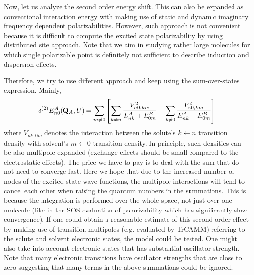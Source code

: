 \documentclass[a4paper,titlepage,twoside,fleqn,12pt]{book}
\begin{document}
Now, let us analyze the second order energy shift. This can also
be expanded as conventional interaction energy with making use
of static and dynamic imaginary frequency dependent polarizabilities.
However, such approach is not convenient because it is difficult
to compute the excited state polarizability by using distributed
site approach. Note that we aim in studying rather large molecules
for which single polarizable point is definitely not sufficient to
describe induction and dispersion effects.

Therefore, we try to use different approach and keep using the 
sum\hyp{}over\hyp{}states expression. Mainly,
%
\begin{equation}
\delta^{(2)} E^A_{n0}({\bf Q}_A, U) = 
\sum_{m\ne 0} 
\left[
\sum_{k\ne n}  \frac{ V_{n0,km}^2 }{E^A_{nk} + E^B_{0m}}
%
- \sum_{k\ne 0} \frac{
V_{n0,km}^2
}{E^A_{nk} + E^B_{0m}}
\right]
\end{equation}
%
where $V_{nk,0m}$ denotes the interaction between the 
solute's $k\leftarrow n$ transition density with
solvent's $m\leftarrow 0$ transition density. In principle,
such densities can be also multipole expanded (exchange effects should
be small compared to the electrostatic effects).
The price we have to pay is to deal with the sum that do not need to
converge fast. Here we hope that due to the increased number
of nodes of the excited state wave functions, the multipole
interactions will tend to cancel each other when raising the
quantum numbers in the summations. This is because
the integration is performed over the whole space, not
just over one molecule (like in the SOS evaluation of polarizability which
has significantly slow convergence).
If one could obtain a reasonable estimate of this second order 
effect by making use of transition multipoles (e.g. evaluated by TrCAMM) 
referring to the solute and solvent electronic
states, the model could be tested. One might also take into account
electronic states that has substantial oscillator strength. Note that
many electronic transitions have oscillator strengths that are
close to zero suggesting that
many terms in the above summations could be ignored.
\end{document}
